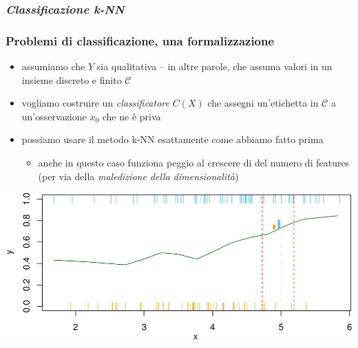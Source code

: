 \subsubsection[Classificazione k-NN]{\textit{Classificazione k-NN}}


\begin{frame}
	\frametitle{Problemi di classificazione, una formalizzazione}

	\begin{itemize}
		\item assumiamo che $Y$ sia qualitativa -- in altre parole, che assuma valori in un insieme discreto e finito $\mathcal{C}$
		\item vogliamo costruire un \emph{classificatore} $C(X)$ che assegni un'etichetta in $\mathcal{C}$ a un'osservazione $x_0$ che ne è priva
		\item possiamo usare il metodo k-NN esattamente come abbiamo fatto prima
			\begin{itemize}
				\item anche in questo caso funziona peggio al crescere di del numero di features (per via della \textit{maledizione della dimensionalità})
			\end{itemize}
	\end{itemize}

	\begin{center}
		\includegraphics[width=0.7\linewidth]{images/supervised/knn_classification/knn_classification_r_plot.png}
	\end{center}
\end{frame}


